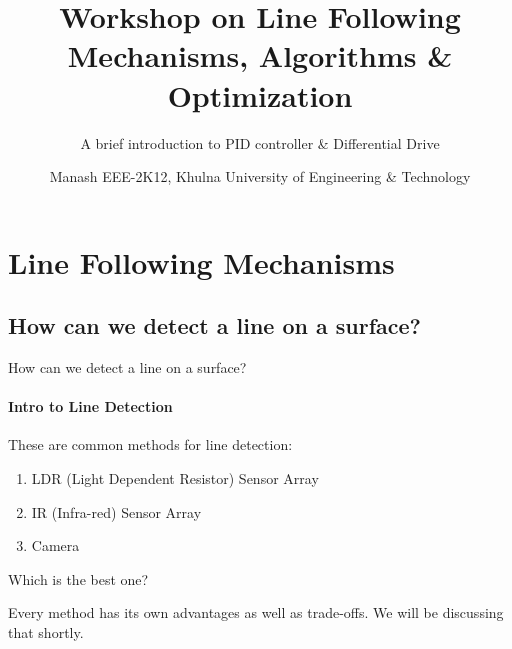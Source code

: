\documentclass{beamer}
\title{Workshop on Line Following Mechanisms, Algorithms \& Optimization}  %
\subtitle{A brief introduction to PID controller \& Differential Drive} %
\author{Manash \newline EEE-2K12, Khulna University of Engineering \& Technology}
\begin{document}
  \frame{\maketitle}


  \section{Line Following Mechanisms}
  \subsection{How can we detect a line on a surface?}
  \begin{frame}{How can we detect a line on a surface?}
    \framesubtitle{Intro to \alert{Line} Detection}%
    
    These are common methods for line detection:
    
    \begin{enumerate}
    	\item{LDR (Light Dependent Resistor) Sensor Array}
    	\item{IR (Infra-red) Sensor Array}
    	\item{Camera}
    \end{enumerate}
    
    \begin{alertblock}{Which is the best one?}
    
	Every method has its own advantages as well as trade-offs. We will be discussing that shortly.
    
    \end{alertblock}
    
    
  \end{frame}

	
\end{document}
